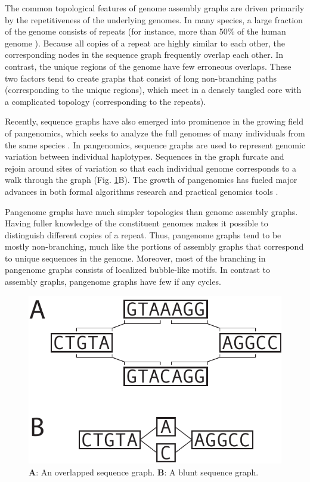 \documentclass[11pt]{ucthesis}
\newcommand{\figref}[1]{Fig. \ref{fig:#1}}
\begin{document}
The common topological features of genome assembly graphs are driven primarily by the repetitiveness of the underlying genomes.
In many species, a large fraction of the genome consists of repeats (for instance, more than 50\% of the human genome \cite{haubold2006repetitive}).
Because all copies of a repeat are highly similar to each other, the corresponding nodes in the sequence graph frequently overlap each other.
In contrast, the unique regions of the genome have few erroneous overlaps.
These two factors tend to create graphs that consist of long non-branching paths (corresponding to the unique regions), which meet in a densely tangled core with a complicated topology (corresponding to the repeats).

Recently, sequence graphs have also emerged into prominence in the growing field of pangenomics, which seeks to analyze the full genomes of many individuals from the same species \cite{computational2018computational}.
In pangenomics, sequence graphs are used to represent genomic variation between individual haplotypes.
Sequences in the graph furcate and rejoin around sites of variation so that each individual genome corresponds to a walk through the graph (\figref{seqgraphs}B).
The growth of pangenomics has fueled major advances in both formal algorithms research \cite{rautiainen2017aligning,jain2019on} and practical genomics tools \cite{garrison2018variation,rautiainen2020graphaligner}.

Pangenome graphs have much simpler topologies than genome assembly graphs.
Having fuller knowledge of the constituent genomes makes it possible to distinguish different copies of a repeat.
Thus, pangenome graphs tend to be mostly non-branching, much like the portions of assembly graphs that correspond to unique sequences in the genome.
Moreover, most of the branching in pangenome graphs consists of localized bubble-like motifs.
In contrast to assembly graphs, pangenome graphs have few if any cycles.

\begin{figure}
\begin{center}
\includegraphics[width=.5\textwidth]{bluntfigures/overlap_vs_blunt.pdf}
\caption{\textbf{A}: An overlapped sequence graph. \textbf{B}: A blunt sequence graph.} \label{fig:seqgraphs}
\end{center}
\end{figure}
\end{document}
